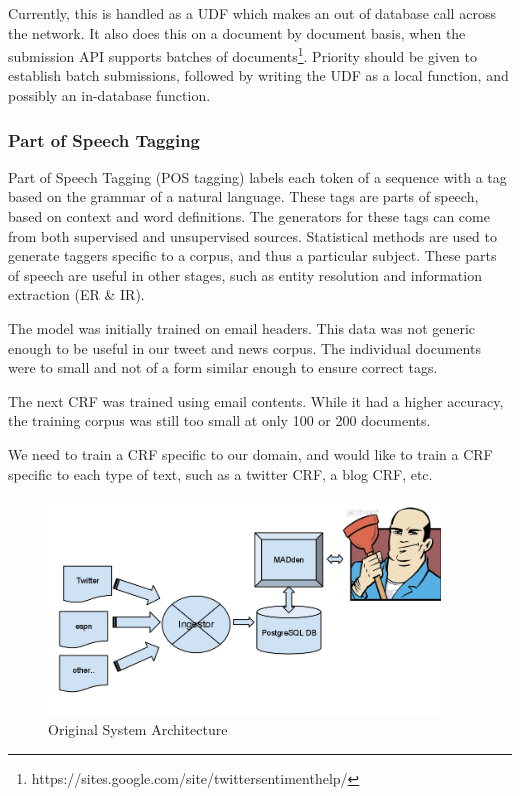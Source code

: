 \documentclass[11pt,onecolumn]{article}
\begin{document}
    Currently, this is handled as a UDF which makes an out of database call across the network.
    It also does this on a document by document basis,
    when the submission API supports batches of documents\footnote{https://sites.google.com/site/twittersentimenthelp/}.
    Priority should be given to establish batch submissions,
    followed by writing the UDF as a local function,
    and possibly an in-database function.

    \subsubsection{Part of Speech Tagging}
    Part of Speech Tagging (POS tagging) labels each token of a sequence with a tag based on the grammar of a natural language.
    These tags are parts of speech, based on context and word definitions.
    The generators for these tags can come from both supervised and unsupervised sources.
    Statistical methods are used to generate taggers specific to a corpus, and thus a particular subject.
    These parts of speech are useful in other stages, such as entity resolution and information extraction (ER \& IR).

    
    The model was initially trained on email headers.
    This data was not generic enough to be useful in our tweet and news corpus.
    The individual documents were to small and not of a form similar enough to ensure correct tags.

    The next CRF was trained using email contents.
    While it had a higher accuracy, the training corpus was still too
		small at only 100 or 200 documents.

    We need to train a CRF specific to our domain,
    and would like to train a CRF specific to each type of text,
    such as a twitter CRF, a blog CRF, etc.

  \begin{figure}
    \begin{center}
      \includegraphics[width=104mm]{architecture-1.png}
      \caption{Original System Architecture}
      \label{fig:architecture}
    \end{center}
  \end{figure}
\end{document}
